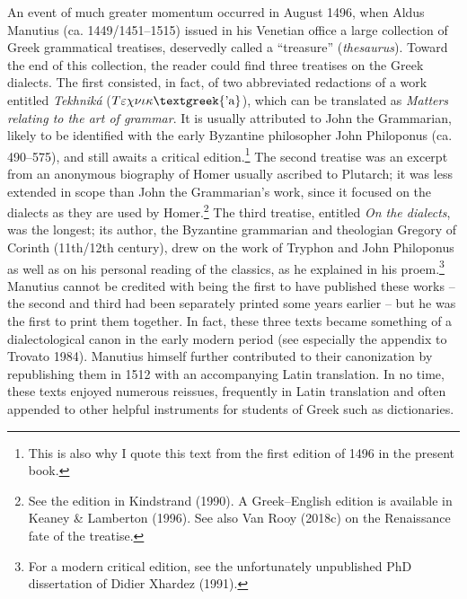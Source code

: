 \documentclass[12pt]{article}
\newenvironment{styleStandard}{\renewcommand\baselinestretch{1.25}\setlength\leftskip{0in}\setlength\rightskip{0in}\setlength\parindent{0.1972in}\setlength\parfillskip{0pt plus 1fil}\setlength\parskip{0in plus 1pt}\writerlistparindent\writerlistleftskip\leavevmode\normalfont\normalsize\writerlistlabel\ignorespaces}{\unskip\vspace{0in plus 1pt}\par}
\newcommand\writerlistleftskip{}
\newcommand\writerlistparindent{}
\newcommand\writerlistlabel{}
\begin{document}
\begin{styleStandard}
An event of much greater momentum occurred in August 1496, when Aldus Manutius (ca. 1449/1451–1515) issued in his Venetian office a large collection of Greek grammatical treatises, deservedly called a “treasure” (\textit{thesaurus}). Toward the end of this collection, the reader could find three treatises on the Greek dialects. The first consisted, in fact, of two abbreviated redactions of a work entitled \textit{Tekhniká} ($T\varepsilon \chi \nu \iota \kappa \text{\textgreek{'a}}$), which can be translated as \textit{Matters relating to the art of grammar}. It is usually attributed to John the Grammarian, likely to be identified with the early Byzantine philosopher John Philoponus (ca. 490–575), and still awaits a critical edition.\footnote{ This is also why I quote this text from the first edition of 1496 in the present book.} The second treatise was an excerpt from an anonymous biography of Homer usually ascribed to Plutarch; it was less extended in scope than John the Grammarian’s work, since it focused on the dialects as they are used by Homer.\footnote{ See the edition in Kindstrand (1990). A Greek–English edition is available in Keaney \& Lamberton (1996). See also Van Rooy (2018c) on the Renaissance fate of the treatise.} The third treatise, entitled \textit{On the dialects}, was the longest; its author, the Byzantine grammarian and theologian Gregory of Corinth (11th/12th century), drew on the work of Tryphon and John Philoponus as well as on his personal reading of the classics, as he explained in his proem.\footnote{ For a modern critical edition, see the unfortunately unpublished PhD dissertation of Didier Xhardez (1991).} Manutius cannot be credited with being the first to have published these works – the second and third had been separately printed some years earlier – but he was the first to print them together. In fact, these three texts became something of a dialectological canon in the early modern period (see especially the appendix to Trovato 1984). Manutius himself further contributed to their canonization by republishing them in 1512 with an accompanying Latin translation. In no time, these texts enjoyed numerous reissues, frequently in Latin translation and often appended to other helpful instruments for students of Greek such as dictionaries.
\end{styleStandard}
\end{document}
